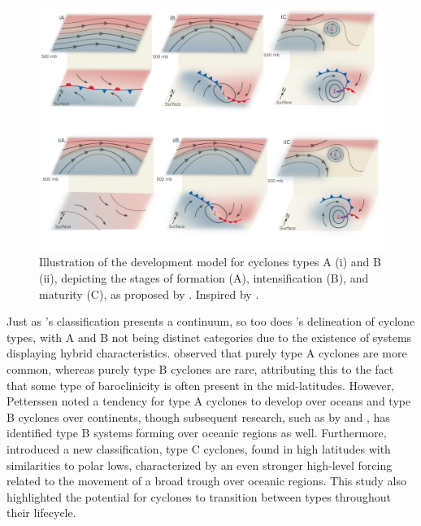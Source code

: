 \begin{figure}[h]
\begin{center}
\setcaptionmargin{1cm}
\includegraphics[width=1\columnwidth,angle=0]{fig/cyclone_pettersen.pdf}
\caption[Model of development of cyclones types A and B.]{Illustration of the development model for cyclones types A (i) and B (ii), depicting the stages of formation (A), intensification (B), and maturity (C), as proposed by \citet{petterssen1971development}. Inspired by \citet{donald2015meteorology}.}
\label{cyclone_pettersen}
\end{center}
\end{figure}

Just as \citet{hart2003cyclone}'s classification presents a continuum, so too does \citet{petterssen1971development}'s delineation of cyclone types, with A and B not being distinct categories due to the existence of systems displaying hybrid characteristics. \citet{petterssen1971development} observed that purely type A cyclones are more common, whereas purely type B cyclones are rare, attributing this to the fact that some type of baroclinicity is often present in the mid-latitudes. However, Petterssen noted a tendency for type A cyclones to develop over oceans and type B cyclones over continents, though subsequent research, such as by \citet{mclennan1988marine} and \citet{deveson2002classification}, has identified type B systems forming over oceanic regions as well. Furthermore, \citet{deveson2002classification} introduced a new classification, type C cyclones, found in high latitudes with similarities to polar lows, characterized by an even stronger high-level forcing related to the movement of a broad trough over oceanic regions. This study also highlighted the potential for cyclones to transition between types throughout their lifecycle.

